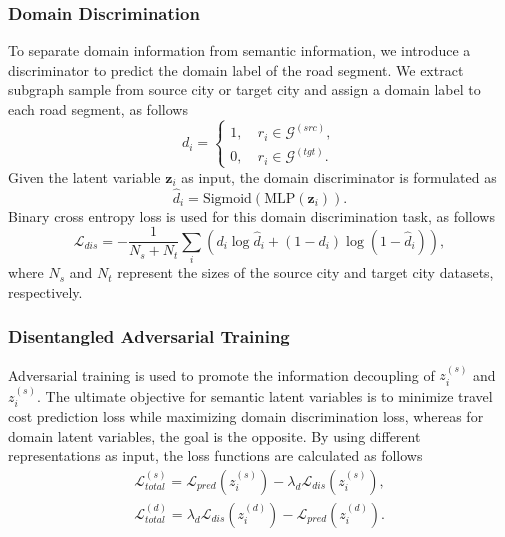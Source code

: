 \subsubsection{Domain Discrimination}
To separate domain information from semantic information, we introduce a discriminator to predict the domain label of the road segment.
We extract subgraph sample from source city or target city and assign a domain label to each road segment, as follows
\begin{equation}
    d_{i} = 
    \begin{cases}
        1, & \ r_i \in \mathcal{G}^{(src)}, \\
        0, & \ r_i \in \mathcal{G}^{(tgt)}.
    \end{cases}
\end{equation}
Given the latent variable $\bm{z}_i$ as input, the domain discriminator is formulated as
\begin{equation}
    \hat{d}_i = \text{Sigmoid} \left( \text{MLP} \left( \bm{z}_i \right) \right).
\end{equation}
Binary cross entropy loss is used for this domain discrimination task, as follows
\begin{equation}
    \mathcal{L}_{dis} = - \frac{1}{N_s + N_t} \sum_i \left( d_i \log \hat{d}_i + ( 1 - d_i) \log ( 1 - \hat{d}_i) \right),
\end{equation}
where $N_s$ and $N_t$ represent the sizes of the source city and target city datasets, respectively.

\subsubsection{Disentangled Adversarial Training} Adversarial training is used to promote the information decoupling of $z_i^{(s)}$ and $z_i^{(s)}$. The ultimate objective for semantic latent variables is to minimize travel cost prediction loss while maximizing domain discrimination loss, whereas for domain latent variables, the goal is the opposite. By using different representations as input, the loss functions are calculated as follows
\begin{equation}
\begin{split}
\mathcal{L}_{total}^{(s)} = \mathcal{L}_{pred}\left(z_i^{(s)}\right) - \lambda_d \mathcal{L}_{dis}\left(z_i^{(s)}\right), \\
\mathcal{L}_{total}^{(d)} = \lambda_d \mathcal{L}_{dis}\left(z_i^{(d)}\right) - \mathcal{L}_{pred}\left(z_i^{(d)}\right).    
\end{split}
\end{equation}

